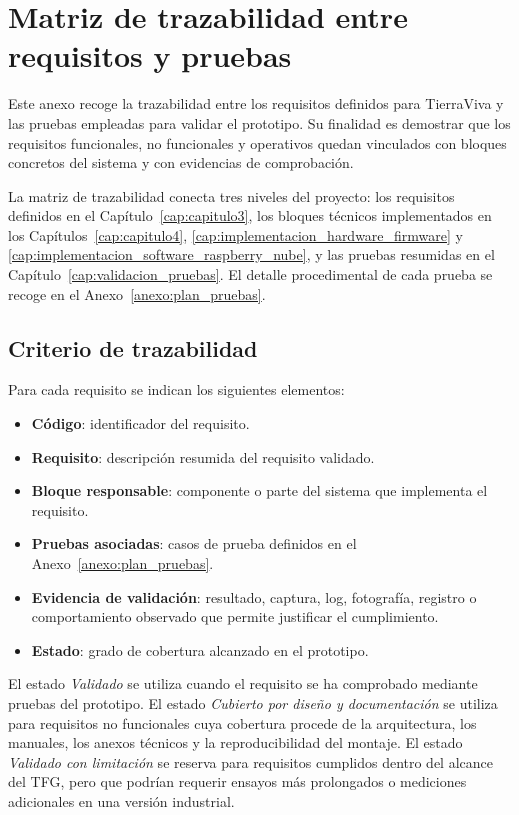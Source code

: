\chapter{Matriz de trazabilidad entre requisitos y pruebas}
\label{anexo:trazabilidad_requisitos_pruebas}

Este anexo recoge la trazabilidad entre los requisitos definidos para TierraViva y las pruebas empleadas para validar el prototipo. Su finalidad es demostrar que los requisitos funcionales, no funcionales y operativos quedan vinculados con bloques concretos del sistema y con evidencias de comprobación.

La matriz de trazabilidad conecta tres niveles del proyecto: los requisitos definidos en el Capítulo~\ref{cap:capitulo3}, los bloques técnicos implementados en los Capítulos~\ref{cap:capitulo4}, \ref{cap:implementacion_hardware_firmware} y \ref{cap:implementacion_software_raspberry_nube}, y las pruebas resumidas en el Capítulo~\ref{cap:validacion_pruebas}. El detalle procedimental de cada prueba se recoge en el Anexo~\ref{anexo:plan_pruebas}.

\section{Criterio de trazabilidad}

Para cada requisito se indican los siguientes elementos:

\begin{itemize}
    \item \textbf{Código}: identificador del requisito.
    \item \textbf{Requisito}: descripción resumida del requisito validado.
    \item \textbf{Bloque responsable}: componente o parte del sistema que implementa el requisito.
    \item \textbf{Pruebas asociadas}: casos de prueba definidos en el Anexo~\ref{anexo:plan_pruebas}.
    \item \textbf{Evidencia de validación}: resultado, captura, log, fotografía, registro o comportamiento observado que permite justificar el cumplimiento.
    \item \textbf{Estado}: grado de cobertura alcanzado en el prototipo.
\end{itemize}

El estado \textit{Validado} se utiliza cuando el requisito se ha comprobado mediante pruebas del prototipo. El estado \textit{Cubierto por diseño y documentación} se utiliza para requisitos no funcionales cuya cobertura procede de la arquitectura, los manuales, los anexos técnicos y la reproducibilidad del montaje. El estado \textit{Validado con limitación} se reserva para requisitos cumplidos dentro del alcance del TFG, pero que podrían requerir ensayos más prolongados o mediciones adicionales en una versión industrial.

